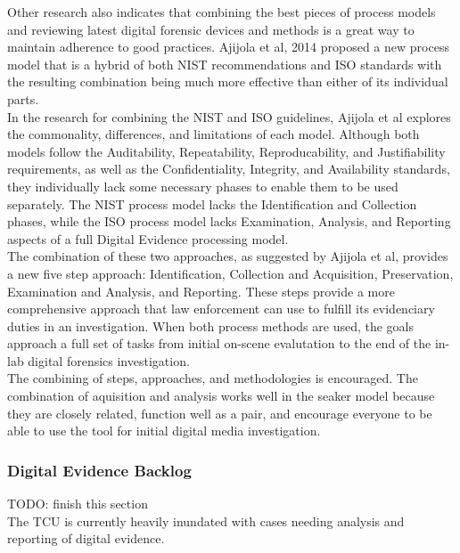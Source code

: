 \documentclass[12pt]{article}
\begin{document}
Other research also indicates that combining the best pieces of process models and reviewing
latest digital forensic devices and methods is a great way to maintain adherence to 
good practices\cite{ajijola2014review}.  Ajijola et al, 2014\cite{ajijola2014review}
proposed a new process model that is a hybrid of both NIST recommendations and ISO standards
with the resulting combination being much more effective than either of its individual parts.\\

In the research for combining the NIST and ISO guidelines, Ajijola et al\cite{ajijola2014review}
explores the commonality, differences, and limitations of each model.  Although both models
follow the Auditability, Repeatability, Reproducability, and Justifiability requirements, as
well as the Confidentiality, Integrity, and Availability standards, they individually lack some
necessary phases to enable them to be used separately.  The NIST process model lacks the
Identification and Collection phases, while the ISO process model lacks Examination, Analysis,
and Reporting aspects of a full Digital Evidence processing model.\\

The combination of these two approaches, as suggested by Ajijola et al\cite{ajijola2014review},
provides a new five step approach: Identification, Collection and Acquisition, Preservation,
Examination and Analysis, and Reporting. These steps provide a more comprehensive approach that
law enforcement can use to fulfill its evidenciary duties in an investigation.  When both
process methods are used, the goals approach a full set of tasks from initial on-scene
evalutation to the end of the in-lab digital forensics investigation.\\

The combining of steps, approaches, and methodologies is encouraged.  The combination of 
aquisition and analysis works well in the \gls{seaker} model because they are closely related,
function well as a pair, and encourage everyone to be able to use the tool for initial digital
media investigation.\\

\subsubsection{Digital Evidence Backlog}
TODO: finish this section\\

The TCU is currently
heavily inundated with cases needing analysis and reporting of digital evidence.
\end{document}
